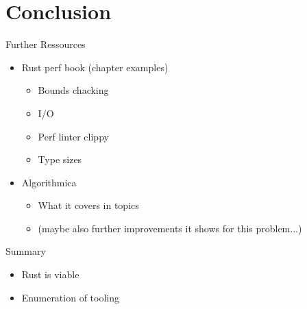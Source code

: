 \documentclass[compress,aspectratio=169]{beamer}
\begin{document}
\section{Conclusion}
\begin{frame}{Further Ressources}
  \begin{itemize}
    \item Rust perf book (chapter examples)
      \begin{itemize}
        \item Bounds chacking
        \item I/O
        \item Perf linter clippy
        \item Type sizes
      \end{itemize}
    \item Algorithmica
      \begin{itemize}
        \item What it covers in topics
        \item (maybe also further improvements it shows for this problem...)
      \end{itemize}
  \end{itemize}
\end{frame}

\begin{frame}{Summary}
\label{pg:lastpage} %
  \begin{itemize}
    \item Rust is viable
    \item Enumeration of tooling
  \end{itemize}
\end{frame}
\end{document}
